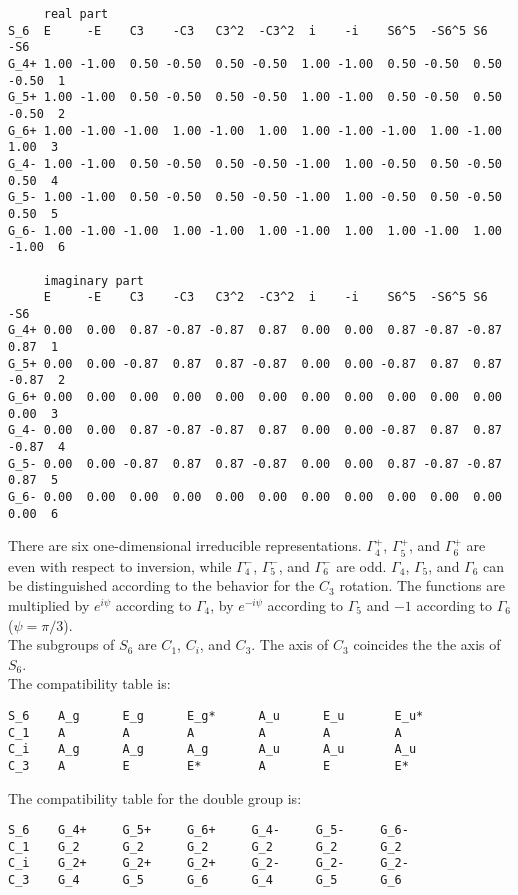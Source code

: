\documentclass[12pt,a4paper]{article}
\begin{document}
\begin{footnotesize}
\begin{verbatim}
     real part
S_6  E     -E    C3    -C3   C3^2  -C3^2  i    -i    S6^5  -S6^5 S6    -S6  
G_4+ 1.00 -1.00  0.50 -0.50  0.50 -0.50  1.00 -1.00  0.50 -0.50  0.50 -0.50  1
G_5+ 1.00 -1.00  0.50 -0.50  0.50 -0.50  1.00 -1.00  0.50 -0.50  0.50 -0.50  2
G_6+ 1.00 -1.00 -1.00  1.00 -1.00  1.00  1.00 -1.00 -1.00  1.00 -1.00  1.00  3
G_4- 1.00 -1.00  0.50 -0.50  0.50 -0.50 -1.00  1.00 -0.50  0.50 -0.50  0.50  4
G_5- 1.00 -1.00  0.50 -0.50  0.50 -0.50 -1.00  1.00 -0.50  0.50 -0.50  0.50  5
G_6- 1.00 -1.00 -1.00  1.00 -1.00  1.00 -1.00  1.00  1.00 -1.00  1.00 -1.00  6

     imaginary part
     E     -E    C3    -C3   C3^2  -C3^2  i    -i    S6^5  -S6^5 S6    -S6  
G_4+ 0.00  0.00  0.87 -0.87 -0.87  0.87  0.00  0.00  0.87 -0.87 -0.87  0.87  1 
G_5+ 0.00  0.00 -0.87  0.87  0.87 -0.87  0.00  0.00 -0.87  0.87  0.87 -0.87  2
G_6+ 0.00  0.00  0.00  0.00  0.00  0.00  0.00  0.00  0.00  0.00  0.00  0.00  3
G_4- 0.00  0.00  0.87 -0.87 -0.87  0.87  0.00  0.00 -0.87  0.87  0.87 -0.87  4
G_5- 0.00  0.00 -0.87  0.87  0.87 -0.87  0.00  0.00  0.87 -0.87 -0.87  0.87  5
G_6- 0.00  0.00  0.00  0.00  0.00  0.00  0.00  0.00  0.00  0.00  0.00  0.00  6
\end{verbatim}
\end{footnotesize}
There are six one-dimensional irreducible representations. $\Gamma_4^+$,
$\Gamma_5^+$, and $\Gamma_6^+$ are even with respect to inversion, while
$\Gamma_4^-$, $\Gamma_5^-$, and $\Gamma_6^-$ are odd. $\Gamma_4$, $\Gamma_5$,
and $\Gamma_6$ can be distinguished according to the behavior for the
$C_3$ rotation. The functions are multiplied by $e^{i\psi}$ according to
$\Gamma_4$, by $e^{-i\psi}$ according to $\Gamma_5$ and $-1$ according
to $\Gamma_6$ ($\psi=\pi/3$). \\
The subgroups of $S_6$ are $C_1$, $C_i$, and $C_3$. The axis of $C_3$ coincides
the the axis of $S_6$. \\
The compatibility table is:
\begin{verbatim}
S_6    A_g      E_g      E_g*      A_u      E_u       E_u*  
C_1    A        A        A         A        A         A
C_i    A_g      A_g      A_g       A_u      A_u       A_u
C_3    A        E        E*        A        E         E*
\end{verbatim}
The compatibility table for the double group is:
\begin{verbatim}
S_6    G_4+     G_5+     G_6+     G_4-     G_5-     G_6-  
C_1    G_2      G_2      G_2      G_2      G_2      G_2
C_i    G_2+     G_2+     G_2+     G_2-     G_2-     G_2-
C_3    G_4      G_5      G_6      G_4      G_5      G_6 
\end{verbatim}
\end{document}
